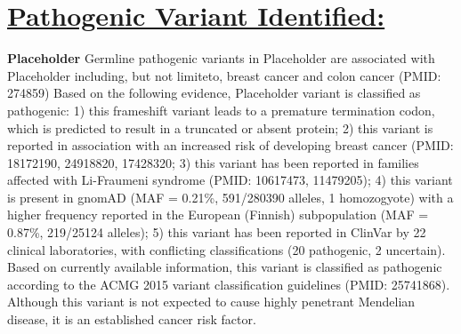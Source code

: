 \documentclass[9pt]{extarticle}
\begin{document}
\section*{\underline {Pathogenic Variant Identified:}\newline}
{\bf Placeholder}
\newline
Germline pathogenic variants in Placeholder are associated with Placeholder including, but not limiteto, breast cancer and colon cancer (PMID: 274859)
\newline
Based on the following evidence, Placeholder variant is classified as pathogenic: 1) this frameshift variant leads to a premature termination codon, which is predicted to result in a truncated or absent protein; 2) this variant is reported in association with an increased risk of developing breast cancer (PMID: 18172190, 24918820, 17428320; 3) this variant has been reported in families affected with Li-Fraumeni syndrome (PMID: 10617473, 11479205); 4) this variant is present in gnomAD (MAF = 0.21\%, 591/280390 alleles, 1 homozogyote) with a higher frequency reported in the European (Finnish) subpopulation (MAF = 0.87\%, 219/25124 alleles); 5) this variant has been reported in ClinVar by 22 clinical laboratories, with conflicting classifications (20 pathogenic, 2 uncertain). Based on currently available information, this variant is classified as pathogenic according to the ACMG 2015 variant classification guidelines (PMID: 25741868). Although this variant is not expected to cause highly penetrant Mendelian disease, it is an established cancer risk factor. 
\end{document}
